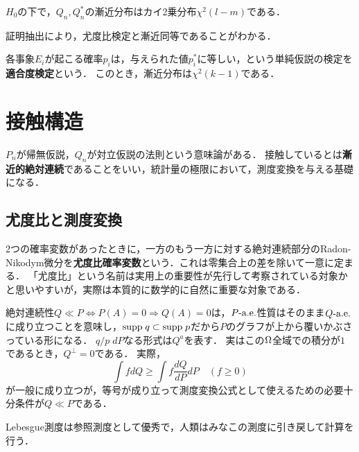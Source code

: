 \documentclass[uplatex,dvipdfmx]{jsreport}
\begin{document}
\begin{theorem}
    $H_0$の下で，$Q_n,Q_n^*$の漸近分布はカイ2乗分布$\chi^2(l-m)$である．
\end{theorem}
\begin{remarks}
    証明抽出により，尤度比検定と漸近同等であることがわかる．
\end{remarks}

\begin{example}
    各事象$E_i$が起こる確率$p_i$は，与えられた値$p^*_i$に等しい，という単純仮説の検定を\textbf{適合度検定}という．
    このとき，漸近分布は$\chi^2(k-1)$である．
\end{example}

\section{接触構造}

\begin{tcolorbox}[colframe=ForestGreen, colback=ForestGreen!10!white,breakable,colbacktitle=ForestGreen!40!white,coltitle=black,fonttitle=\bfseries\sffamily,
title=]
    $P_n$が帰無仮説，$Q_n$が対立仮説の法則という意味論がある．
    接触しているとは\textbf{漸近的絶対連続}であることをいい，統計量の極限において，測度変換を与える基礎になる．
\end{tcolorbox}

\subsection{尤度比と測度変換}

\begin{tcolorbox}[colframe=ForestGreen, colback=ForestGreen!10!white,breakable,colbacktitle=ForestGreen!40!white,coltitle=black,fonttitle=\bfseries\sffamily,
title=測度変換の公式が成り立つためには，絶対連続性が必要である．]
    2つの確率変数があったときに，一方のもう一方に対する絶対連続部分のRadon-Nikodym微分を\textbf{尤度比確率変数}という．これは零集合上の差を除いて一意に定まる．
    「尤度比」という名前は実用上の重要性が先行して考察されている対象かと思いやすいが，実際は本質的に数学的に自然に重要な対象である．

    絶対連続性$Q\ll P\Leftrightarrow P(A)=0\Rightarrow Q(A)=0$は，$P\text{-a.e.}$性質はそのまま$Q\text{-a.e.}$に成り立つことを意味し，$\mathrm{supp}\; q\subset\mathrm{supp}\; p$だから$P$のグラフが上から覆いかぶさっている形になる．
    $q/p\; dP$なる形式は$Q^a$を表す．
    実はこの$\Omega$全域での積分が$1$であるとき，$Q^\perp=0$である．
    実際，
    \[\int fdQ\ge\int f\frac{dQ}{dP}dP\quad(f\ge0)\]
    が一般に成り立つが，等号が成り立って測度変換公式として使えるための必要十分条件が$Q\ll P$である．

    Lebesgue測度は参照測度として優秀で，人類はみなこの測度に引き戻して計算を行う．
\end{tcolorbox}
\end{document}
